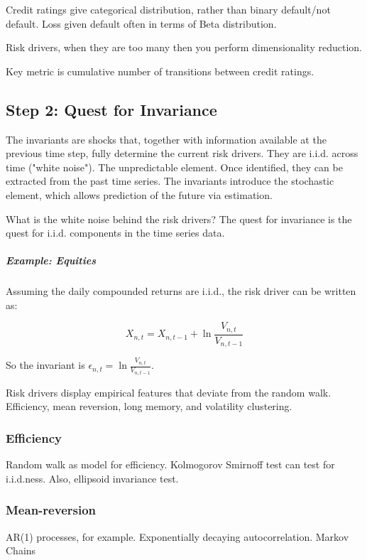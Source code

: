 Credit ratings give categorical distribution, rather than binary default/not default. Loss given default often in terms of Beta distribution.

Risk drivers, when they are too many then you perform dimensionality reduction.

Key metric is cumulative number of transitions between credit ratings. 


\subsection{Step 2: Quest for Invariance}
The invariants are shocks that, together with information available at the previous time step, fully determine the current risk drivers. They are i.i.d. across time ("white noise"). The unpredictable element. Once identified, they can be extracted from the past time series. The invariants introduce the stochastic element, which allows prediction of the future via estimation.

What is the white noise behind the risk drivers? The quest for invariance is the quest for i.i.d. components in the time series data.

\subparagraph{Example: Equities} Assuming the daily compounded returns are i.i.d., the risk driver can be written as:

\begin{equation}
X_{n,t} = X_{n,t-1} + \ln\frac{V_{n,t}}{V_{n,t-1}}
\end{equation}

So the invariant is $\epsilon_{n,t} = \ln\frac{V_{n,t}}{V_{n,t-1}}$.

Risk drivers display empirical features that deviate from the random walk. Efficiency, mean reversion, long memory, and volatility clustering.


\subsubsection{Efficiency}

Random walk as model for efficiency. Kolmogorov Smirnoff test can test for i.i.d.ness. Also, ellipsoid invariance test. 


\subsubsection{Mean-reversion}

AR(1) processes, for example. Exponentially decaying autocorrelation. Markov Chains



